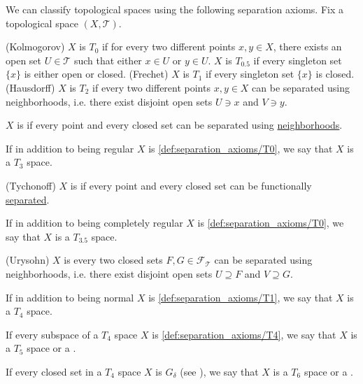 \begin{definition}\label{def:separation_axioms}
  We can classify topological spaces using the following separation axioms. Fix a topological space \( (X, \mathcal{T}) \).

  \begin{thmenum}
     (Kolmogorov) \( X \) is \( T_0 \) if for every two different points \( x, y \in X \), there exists an open set \( U \in \mathcal{T} \) such that either \( x \in U \) or \( y \in U \).
     \( X \) is \( T_{0.5} \) if every singleton set \( \{ x \} \) is either open or closed.
     (Frechet) \( X \) is \( T_1 \) if every singleton set \( \{ x \} \) is closed.
     (Hausdorff) \( X \) is \( T_2 \) if every two different points \( x, y \in X \) can be separated using neighborhoods, i.e. there exist disjoint open sets \( U \ni x \) and \( V \ni y \).

     \( X \) is  if every point and every closed set can be separated using \hyperref[def:topological_space_separation]{neighborhoods}.

    If in addition to being regular \( X \) is \ref{def:separation_axioms/T0}, we say that \( X \) is a \( T_3 \) space.

     (Tychonoff) \( X \) is  if every point and every closed set can be functionally \hyperref[def:topological_space_separation]{separated}.

    If in addition to being completely regular \( X \) is \ref{def:separation_axioms/T0}, we say that \( X \) is a \( T_{3.5} \) space.

    (Urysohn) \( X \) is  every two closed sets \( F, G \in \mathcal{F}_{\mathcal{T}} \) can be separated using neighborhoods, i.e. there exist disjoint open sets \( U \supseteq F \) and \( V \supseteq G \).

    If in addition to being normal \( X \) is \ref{def:separation_axioms/T1}, we say that \( X \) is a \( T_4 \) space.

     If every subspace of a \( T_4 \) space \( X \) is \ref{def:separation_axioms/T4}, we say that \( X \) is a \( T_5 \) space or a .

     If every closed set in a \( T_4 \) space \( X \) is \( G_\delta \) (see ), we say that \( X \) is a \( T_6 \) space or a .
  \end{thmenum}
\end{definition}

